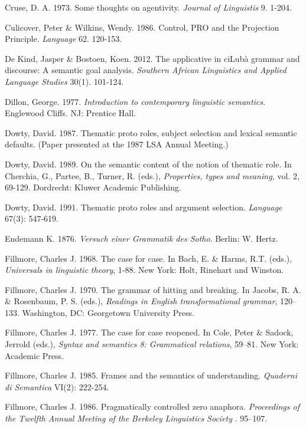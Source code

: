 Cruse, D. A. 1973. Some thoughts on agentivity. \textit{Journal of Linguistis }9. 1-204.

Culicover, Peter \& Wilkins, Wendy. 1986. Control, PRO and the Projection Principle. \textit{Language}\textit{ }62. 120-153.

De Kind, Jasper \& Bostoen, Koen. 2012. The applicative in ciLubà grammar and discourse: A semantic goal analysis. \textit{Southern African Linguistics and Applied Language Studies }30(1). 101-124.

Dillon, George. 1977. \textit{Introduction to contemporary linguistic semantics.} Englewood Cliffs. NJ: Prentice Hall.

Dowty, David. 1987. Thematic proto roles, subject selection and lexical semantic defaults. (Paper presented at the 1987 LSA Annual Meeting.)

Dowty, David. 1989. On the semantic content of the notion of thematic role. In Cherchia,   G., Partee, B., Turner, R. (eds.), \textit{Properties, types and meaning, }vol. 2\textit{, }69-129.   Dordrecht: Kluwer Academic Publishing.

Dowty, David. 1991. Thematic proto roles and argument selection. \textit{Language} 67(3): 547-619.

Endemann K. 1876. \textit{Versuch einer Grammatik des Sotho}. Berlin: W. Hertz. 

Fillmore, Charles J. 1968. The case for case. In Bach, E. \& Harms, R.T.  (eds.), \textit{Universals in linguistic theory}, 1-88. New York: Holt, Rinehart and Winston. 

Fillmore, Charles J. 1970. The grammar of hitting and breaking. In Jacobs, R. A. \& Rosenbaum, P. S. (eds.), \textit{Readings in English transformational grammar}, 120–133. Washington, DC: Georgetown University Press.

Fillmore, Charles J. 1977. The case for case reopened. In Cole, Peter \& Sadock, Jerrold (eds.),   \textit{Syntax and semantics 8: Grammatical relations}, 59–81. New York: Academic Press.

Fillmore, Charles J. 1985. Frames and the semantics of understanding. \textit{Quaderni di Semantica} VI(2): 222-254.

Fillmore, Charles J. 1986. Pragmatically controlled zero anaphora. \textit{Proceedings of the Twelfth Annual Meeting of the }\textit{Ber}\textit{k}\textit{ele}\textit{y}\textit{ }\textit{Li}\textit{n}\textit{g}\textit{u}\textit{is}\textit{t}\textit{ics}\textit{ }\textit{Socie}\textit{ty} . 95–107.

